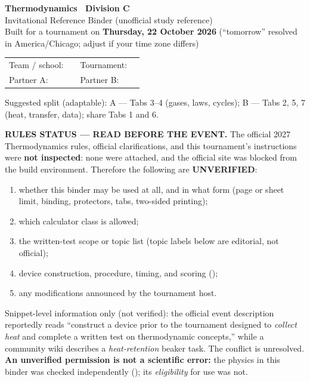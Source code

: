 \thispagestyle{plain}
\begin{center}
{\Huge\bfseries Thermodynamics \textendash\ Division C}\\[3pt]
{\Large Invitational Reference Binder (unofficial study reference)}\\[4pt]
{\normalsize Built \builddate{} for a tournament on \textbf{Thursday, 22 October 2026} (``tomorrow'' resolved in America/Chicago; adjust if your time zone differs)}
\end{center}
\vspace{2pt}
{\small
\begin{tabularx}{\textwidth}{@{}lXlX@{}}
Team / school: & \hrulefill & Tournament: & \hrulefill\\[4pt]
Partner A: & \hrulefill & Partner B: & \hrulefill\\
\end{tabularx}
Suggested split (adaptable): A --- Tabs 3--4 (gases, laws, cycles); B --- Tabs 2, 5, 7 (heat, transfer, data); share Tabs 1 and 6.}
\vspace{2pt}

\begin{rulebox}\label{sec:status}\textbf{RULES STATUS --- READ BEFORE THE EVENT.} The official 2027 Thermodynamics rules, official clarifications, and this tournament's instructions were \textbf{not inspected}: none were attached, and the official site was blocked from the build environment. Therefore the following are \textbf{UNVERIFIED}:
\begin{enumerate}
\item whether this binder may be used at all, and in what form (page or sheet limit, binding, protectors, tabs, two-sided printing);
\item which calculator class is allowed;
\item the written-test scope or topic list (topic labels below are editorial, not official);
\item device construction, procedure, timing, and scoring ();
\item any modifications announced by the tournament host.
\end{enumerate}
Snippet-level information only (not verified): the official event description reportedly reads ``construct a device prior to the tournament designed to \emph{collect heat} and complete a written test on thermodynamic concepts,'' while a community wiki describes a \emph{heat-retention} beaker task. The conflict is unresolved. \textbf{An unverified permission is not a scientific error:} the physics in this binder was checked independently (); its \emph{eligibility} for use was not.\end{rulebox}

